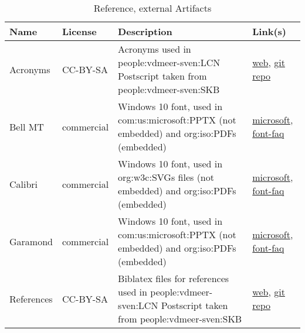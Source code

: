 \begin{table}[H]
    \caption{Reference, external Artifacts}
    \label{tab:ref:ext:artifacts}
    \centering
    \begin{tabular}{p{} p{} p{} p{}}
        \toprule
        \textbf{Name} & \textbf{License} & \textbf{Description} & \textbf{Link(s)}\\
        \toprule

        Acronyms & CC-BY-SA &
        Acronyms used in \acs{people:vdmeer-sven:LCN} Postscript taken from \acs{people:vdmeer-sven:SKB} &
        \href{https://vdmeer.github.io/skb/}{web}, %
        \href{https://github.com/vdmeer/skb}{git repo}
        \\

        Bell MT & commercial &
        Windows 10 font, used in \acs{com:us:microsoft:PPTX} (not embedded) and \acsp{org:iso:PDF} (embedded) &
        \href{https://docs.microsoft.com/en-us/typography/font-list/bell-mt}{microsoft}, %
        \href{https://docs.microsoft.com/en-us/typography/fonts/font-faq}{font-faq}
        \\

        Calibri & commercial &
        Windows 10 font, used in \acsp{org:w3c:SVG} files (not embedded) and \acsp{org:iso:PDF} (embedded) &
        \href{https://docs.microsoft.com/en-us/typography/font-list/calibri}{microsoft}, %
        \href{https://docs.microsoft.com/en-us/typography/fonts/font-faq}{font-faq}
        \\

        Garamond & commercial &
        Windows 10 font, used in \acs{com:us:microsoft:PPTX} (not embedded) and \acsp{org:iso:PDF} (embedded) &
        \href{https://docs.microsoft.com/en-us/typography/font-list/garamond}{microsoft}, %
        \href{https://docs.microsoft.com/en-us/typography/fonts/font-faq}{font-faq}
        \\

        References & CC-BY-SA &
        Biblatex files for references used in \acs{people:vdmeer-sven:LCN} Postscript taken from \acs{people:vdmeer-sven:SKB} &
        \href{https://vdmeer.github.io/skb/}{web}, %
        \href{https://github.com/vdmeer/skb}{git repo}
        \\

        \toprule
    \end{tabular}
\end{table}



